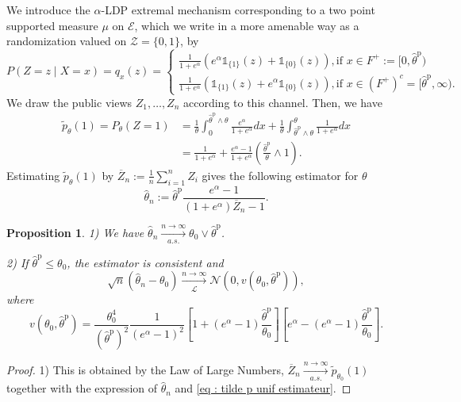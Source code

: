 \documentclass[a4paper, 11pt]{article}
\newtheorem{prop}{Proposition}
\theoremstyle{definition}
\newcommand{\cE}{{\mathcal{E}}}
\newcommand{\cL}{{\mathcal{L}}}
\newcommand{\cZ}{{\mathcal{Z}}}
\newcommand{\indi}[1]{\mathds{1}_{#1}}
\begin{document}
{ We introduce the $\alpha$-LDP extremal mechanism corresponding to a two point supported measure $\mu$ on $\cE$, which we write in a more amenable way as a randomization valued on $\cZ=\{0,1\}$, by
 \begin{equation*}
 	P(Z=z \mid X=x)=q_x(z)=
 	\begin{cases}
 		\frac{1}{1+e^\alpha}\left(e^\alpha \indi{\{1\}}(z)+\indi{\{0\}}(z) \right),
 		\text{if $x \in F^+:=[0,\widehat{\theta}^{\text{p}})$}
 		\\
 		\frac{1}{1+e^\alpha}\left( \indi{\{1\}}(z)+e^\alpha \indi{\{0\}}(z) \right),
 		\text{if $x \in (F^+)^c=[\widehat{\theta}^{\text{p}} ,\infty)$}.
 	\end{cases}
 \end{equation*}
We draw the public views $Z_1,\dots,Z_n$ according to this channel. 
Then, we have 
\begin{align} \nonumber
	\widetilde{p}_{\theta}(1)=P_\theta(Z=1)&=\frac{1}{\theta}\int_0^{\widehat{\theta}^{\text{p}} \wedge \theta} \frac{e^\alpha}{1+e^\alpha} dx +
	\frac{1}{\theta}
	\int_{\widehat{\theta}^{\text{p}} \wedge \theta}^{\theta} \frac{1}{1+e^\alpha} dx 
	\\&= \label{eq : tilde p unif estimateur}
	\frac{1}{1+e^\alpha} + \frac{e^\alpha-1}{1+e^\alpha} \left(\frac{\widehat{\theta}^{\text{p}}}{\theta} \wedge 1 \right).
\end{align}
 Estimating $\widetilde{p}_{\theta}(1)$ by $\overline{Z}_n:=\frac{1}{n}\sum_{i=1}^n Z_i$ gives the following estimator for $\theta$
 \begin{equation*}
 	\widehat{\theta}_n:= \widehat{\theta}^{\text{p}} \frac{e^\alpha -1}{(1+e^\alpha) \overline{Z}_n -1}.
 \end{equation*}
 \begin{prop}
 	1) We have $\widehat{\theta}_n \xrightarrow[a.s.]{n\to\infty} \theta_0 \vee \widehat{\theta}^{\text{p}}$.
 	
 	2) If $\widehat{\theta}^{\text{p}} \le \theta_0$, the estimator is consistent and
 	\begin{equation*}
 		\sqrt{n} \left(\widehat{\theta}_n-\theta_0\right)
 		\xrightarrow[\cL]{n \to \infty} \mathcal{N}\left(0,v(\theta_0,\widehat{\theta}^{\text{p}})\right),
 	\end{equation*}
 	where 
 	\begin{equation*}
 		v(\theta_0,\widehat{\theta}^{\text{p}})=
 		\frac{\theta_0^4}{(\widehat{\theta}^{\text{p}})^2} \frac{1}{(e^\alpha-1)^2}
 		\left[1+(e^\alpha-1) \frac{\widehat{\theta}^{\text{p}}}{\theta_0}\right]
 		\left[e^\alpha-(e^\alpha-1) \frac{\widehat{\theta}^{\text{p}}}{\theta_0}\right].
 	\end{equation*}
 \end{prop}
 \begin{proof} 1) This is obtained by the Law of Large Numbers, $\overline{Z}_n
 	\xrightarrow[a.s.]{n\to\infty}  \widetilde{p}_{\theta_0}(1)$ together with the expression of $\widehat{\theta}_n$ and \eqref{eq : tilde p unif estimateur}.
 	

\end{proof}}
\end{document}
